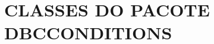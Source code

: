 \chapter{CLASSES DO PACOTE DBCCONDITIONS}
\label{classesDbcCondition} 
\vspace{-6mm}

\begin{small}
\scriptsize

\end{small}
